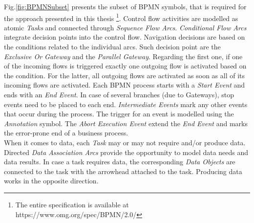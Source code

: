 \noindent
Fig.\ref{fig:BPMNSubset} presents the subset of BPMN symbols, that is required for the approach presented in this thesis \footnote{The entire specification is available at https://www.omg.org/spec/BPMN/2.0/}. Control flow activities are modelled as atomic \textit{Tasks} and connected through \textit{Sequence Flow Arcs}. \textit{Conditional Flow Arcs} integrate decision points into the control flow. Navigation decisions are based on the conditions related to the individual arcs. Such decision point are the \textit{Exclusive Or Gateway} and the \textit{Parallel Gateway}. Regarding the first one, if one of the incoming flows is triggered exactly one outgoing flow is activated based on the condition. For the latter, all outgoing flows are activated as soon as all of its incoming flows are activated. Each BPMN process starts with a \textit{Start Event} and ends with an \textit{End Event}. In case of several branches (due to Gateways), stop events need to be placed to each end. \textit{Intermediate Events} mark any other events that occur during the process. The trigger for an event is modelled using the \textit{Annotation} symbol. The \textit{Abort Execution Event} extend the \textit{End Event} and marks the error-prone end of a business process. \\
When it comes to data, each \textit{Task} may or may not require and/or produce data. Directed \textit{Data Association Arcs} provide the opportunity to model data needs and data results. In case a task requires data, the corresponding \textit{Data Objects} are connected to the task with the arrowhead attached to the task. Producing data works in the opposite direction. \\








